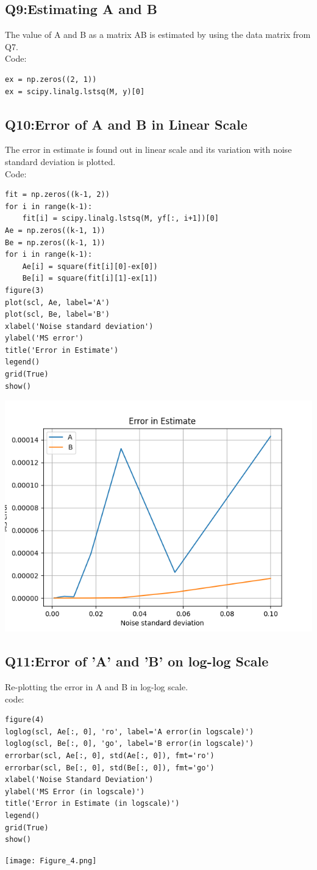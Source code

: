 \documentclass[12pt, a4paper]{report}
\begin{document}
\subsection{Q9:Estimating A and B}
The value of A and B as a matrix AB is estimated by using the data matrix from Q7.\\
Code:
\begin{verbatim}
ex = np.zeros((2, 1))
ex = scipy.linalg.lstsq(M, y)[0]
\end{verbatim}

\subsection{Q10:Error of A and B in Linear Scale}
The error in estimate is found out in linear scale and its variation with noise standard deviation is plotted.\\
Code:
\begin{verbatim}
fit = np.zeros((k-1, 2))
for i in range(k-1):
    fit[i] = scipy.linalg.lstsq(M, yf[:, i+1])[0]
Ae = np.zeros((k-1, 1))
Be = np.zeros((k-1, 1))
for i in range(k-1):
    Ae[i] = square(fit[i][0]-ex[0])
    Be[i] = square(fit[i][1]-ex[1])
figure(3)
plot(scl, Ae, label='A')
plot(scl, Be, label='B')
xlabel('Noise standard deviation')
ylabel('MS error')
title('Error in Estimate')
legend()
grid(True)
show()
\end{verbatim}
	\centering
	\includegraphics[scale=0.8]{Figure_3.png}
	\caption{Error on linear scale.}

\subsection{Q11:Error of 'A' and 'B' on log-log Scale}
Re-plotting the error in A and B in log-log scale.\\
code:
\begin{verbatim}
figure(4)
loglog(scl, Ae[:, 0], 'ro', label='A error(in logscale)')
loglog(scl, Be[:, 0], 'go', label='B error(in logscale)')
errorbar(scl, Ae[:, 0], std(Ae[:, 0]), fmt='ro')
errorbar(scl, Be[:, 0], std(Be[:, 0]), fmt='go')
xlabel('Noise Standard Deviation')
ylabel('MS Error (in logscale)')
title('Error in Estimate (in logscale)')
legend()
grid(True)
show()
\end{verbatim}
	\centering
	\texttt{[image: Figure\_4.png]}
	\caption{Error on log-log Scale.}
\end{document}
